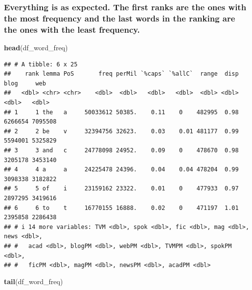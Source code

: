 \documentclass[
]{article}
\newenvironment{Shaded}{\begin{snugshade}}{\end{snugshade}}
\newcommand{\FunctionTok}[1]{\textcolor[rgb]{0.13,0.29,0.53}{\textbf{#1}}}
\newcommand{\NormalTok}[1]{#1}
\begin{document}
\hypertarget{everything-is-as-expected.-the-first-ranks-are-the-ones-with-the-most-frequency-and-the-last-words-in-the-ranking-are-the-ones-with-the-least-frequency.}{%
\subsubsection{Everything is as expected. The first ranks are the ones
with the most frequency and the last words in the ranking are the ones
with the least
frequency.}\label{everything-is-as-expected.-the-first-ranks-are-the-ones-with-the-most-frequency-and-the-last-words-in-the-ranking-are-the-ones-with-the-least-frequency.}}

\begin{Shaded}
\begin{Highlighting}[]
\FunctionTok{head}\NormalTok{(df\_word\_freq)}
\end{Highlighting}
\end{Shaded}

\begin{verbatim}
## # A tibble: 6 x 25
##    rank lemma PoS       freq perMil `%caps` `%allC`  range  disp    blog     web
##   <dbl> <chr> <chr>    <dbl>  <dbl>   <dbl>   <dbl>  <dbl> <dbl>   <dbl>   <dbl>
## 1     1 the   a     50033612 50385.    0.11    0    482995  0.98 6266654 7095508
## 2     2 be    v     32394756 32623.    0.03    0.01 481177  0.99 5594001 5325829
## 3     3 and   c     24778098 24952.    0.09    0    478670  0.98 3205178 3453140
## 4     4 a     a     24225478 24396.    0.04    0.04 478204  0.99 3098338 3182822
## 5     5 of    i     23159162 23322.    0.01    0    477933  0.97 2897295 3419616
## 6     6 to    t     16770155 16888.    0.02    0    471197  1.01 2395858 2286438
## # i 14 more variables: TVM <dbl>, spok <dbl>, fic <dbl>, mag <dbl>, news <dbl>,
## #   acad <dbl>, blogPM <dbl>, webPM <dbl>, TVMPM <dbl>, spokPM <dbl>,
## #   ficPM <dbl>, magPM <dbl>, newsPM <dbl>, acadPM <dbl>
\end{verbatim}

\begin{Shaded}
\begin{Highlighting}[]
\FunctionTok{tail}\NormalTok{(df\_word\_freq)}
\end{Highlighting}
\end{Shaded}
\end{document}
